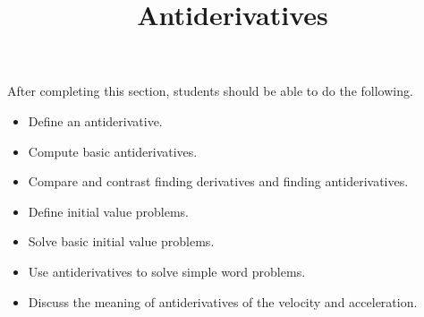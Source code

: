 \documentclass{ximera}
\title{Antiderivatives}
\begin{document}
\begin{abstract}
\end{abstract}

\maketitle

\begin{sectionOutcomes}

After completing this section, students should be able to do the following.

\begin{itemize}
	\item Define an antiderivative.
	\item Compute basic antiderivatives.
	\item Compare and contrast finding derivatives and finding antiderivatives.
	\item Define initial value problems.
	\item Solve basic initial value problems.
	\item Use antiderivatives to solve simple word problems.
	\item Discuss the meaning of antiderivatives of the velocity and acceleration.
\end{itemize}

\end{sectionOutcomes}
\end{document}

